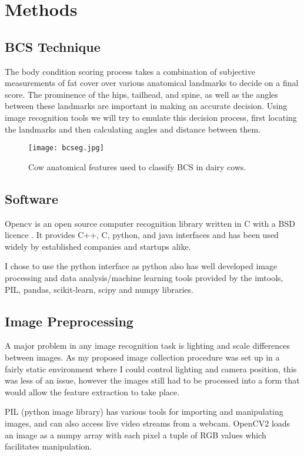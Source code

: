 \documentclass[11pt]{article}
\begin{document}
\section{Methods}
	\subsection{BCS Technique}
		The body condition scoring process takes a combination of subjective measurements of fat cover over various anatomical landmarks to decide on a final score.
		The prominence of the hips, tailhead, and spine, as well as the angles between these landmarks are important in making an accurate decision.
		Using image recognition tools we will try to emulate this decision process, first locating the landmarks and then calculating angles and distance between them.

	\begin{figure}[h!]
		\centering
		\texttt{[image: bcseg.jpg]}
		\caption{Cow anatomical features used to classify BCS in dairy cows. \cite{Elanco}}
		\label{fig:<+label+>}
	\end{figure}


\subsection{Software}
	Opencv is an open source computer recognition library written in C with a BSD licence \cite{opencv_library}.
	It provides C++, C, python, and java interfaces and has been used widely by established companies and startups alike.


	I chose to use the python interface as python also has well developed image processing and data analysis/machine learning tools provided by the imtools, PIL, pandas, scikit-learn, scipy and numpy libraries.

	\newpage
\subsection{Image Preprocessing}
	A major problem in any image recognition task is lighting and scale differences between images.
	As my proposed image collection procedure was set up in a fairly static environment where I could control lighting and camera position, this was less of an issue, however the images still had to be processed into a form that would allow the feature extraction to take place.


	PIL (python image library) has various tools for importing and manipulating images, and can also access live video streams from a webcam.
	OpenCV2 loads an image as a numpy array with each pixel a tuple of RGB values which facilitates manipulation.
\end{document}
